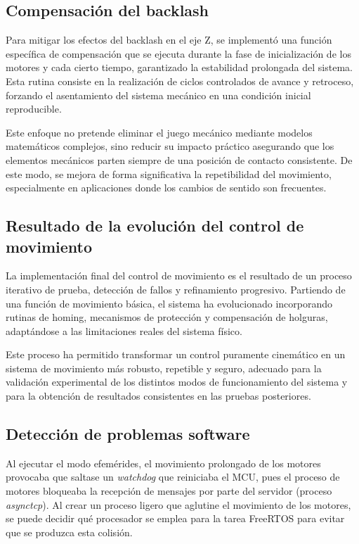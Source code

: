 \subsection{Compensación del backlash}

Para mitigar los efectos del backlash en el eje Z, se implementó una función específica de compensación que se ejecuta durante la fase de inicialización de los motores y cada cierto tiempo, garantizado la estabilidad prolongada del sistema. Esta rutina consiste en la realización de ciclos controlados de avance y retroceso, forzando el asentamiento del sistema mecánico en una condición inicial reproducible.

Este enfoque no pretende eliminar el juego mecánico mediante modelos matemáticos complejos, sino reducir su impacto práctico asegurando que los elementos mecánicos parten siempre de una posición de contacto consistente. De este modo, se mejora de forma significativa la repetibilidad del movimiento, especialmente en aplicaciones donde los cambios de sentido son frecuentes.

\subsection{Resultado de la evolución del control de movimiento}

La implementación final del control de movimiento es el resultado de un proceso iterativo de prueba, detección de fallos y refinamiento progresivo. Partiendo de una función de movimiento básica, el sistema ha evolucionado incorporando rutinas de homing, mecanismos de protección y compensación de holguras, adaptándose a las limitaciones reales del sistema físico.

Este proceso ha permitido transformar un control puramente cinemático en un sistema de movimiento más robusto, repetible y seguro, adecuado para la validación experimental de los distintos modos de funcionamiento del sistema y para la obtención de resultados consistentes en las pruebas posteriores.

\subsection{Detección de problemas software}

Al ejecutar el modo efemérides, el movimiento prolongado de los motores provocaba que saltase un \textit{watchdog} que reiniciaba el MCU, pues el proceso de motores bloqueaba la recepción de mensajes por parte del servidor (proceso \textit{asynctcp}). Al crear un proceso ligero que aglutine el movimiento de los motores, se puede decidir qué procesador se emplea para la tarea FreeRTOS para evitar que se produzca esta colisión. 


